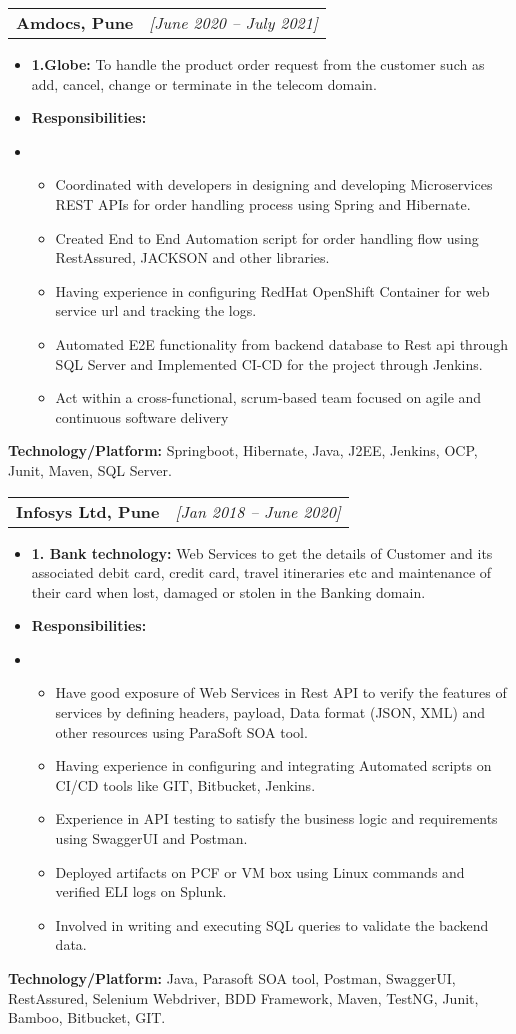 \documentclass[a4paper,10pt]{article}
\makeatletter
\newcommand{\resitem}[1]{\item #1}
\newcommand{\ressubheading}[3]{\begin{tabular*}{6.62in}{l @{\extracolsep{\fill}} r} \textbf{#1} & \textit{[#2]} \\ \end{tabular*}\vspace{-8pt}}
\makeatother
\begin{document}
\vspace{0.5em}
\ressubheading{Amdocs, Pune}{June 2020 – July 2021}{Software Engineer}
\begin{itemize}[nosep]
    \resitem{\textbf{1.Globe:} To handle the product order request from the customer such as add, cancel, change or terminate in the telecom domain.}
    \resitem{\textbf{Responsibilities:}}
    \resitem{\begin{itemize}
        \item Coordinated with developers in designing and developing Microservices REST APIs for order handling process using Spring and Hibernate.
        \item Created End to End Automation script for order handling flow using RestAssured, JACKSON and other libraries.
        \item Having experience in configuring RedHat OpenShift Container for web service url and tracking the logs.
        \item Automated E2E functionality from backend database to Rest api through SQL Server and Implemented CI-CD for the project through Jenkins.
        \item Act within a cross-functional, scrum-based team focused on agile and continuous software delivery
    \end{itemize}}
\end{itemize}
\textbf{Technology/Platform:} Springboot, Hibernate, Java, J2EE, Jenkins, OCP, Junit, Maven, SQL Server.

\vspace{0.5em}
\ressubheading{Infosys Ltd, Pune}{Jan 2018 – June 2020}{System Engineer}
\begin{itemize}[nosep]
    \resitem{\textbf{1. Bank technology:} Web Services to get the details of Customer and its associated debit card, credit card, travel itineraries etc and maintenance of their card when lost, damaged or stolen in the Banking domain.}
    \resitem{\textbf{Responsibilities:}}
    \resitem{\begin{itemize}
        \item Have good exposure of Web Services in Rest API to verify the features of services by defining headers, payload, Data format (JSON, XML) and other resources using ParaSoft SOA tool.
        \item Having experience in configuring and integrating Automated scripts on CI/CD tools like GIT, Bitbucket, Jenkins.
        \item Experience in API testing to satisfy the business logic and requirements using SwaggerUI and Postman.
        \item Deployed artifacts on PCF or VM box using Linux commands and verified ELI logs on Splunk.
        \item Involved in writing and executing SQL queries to validate the backend data.
    \end{itemize}}
\end{itemize}
\textbf{Technology/Platform:} Java, Parasoft SOA tool, Postman, SwaggerUI, RestAssured, Selenium Webdriver, BDD Framework, Maven, TestNG, Junit, Bamboo, Bitbucket, GIT.
\end{document}
